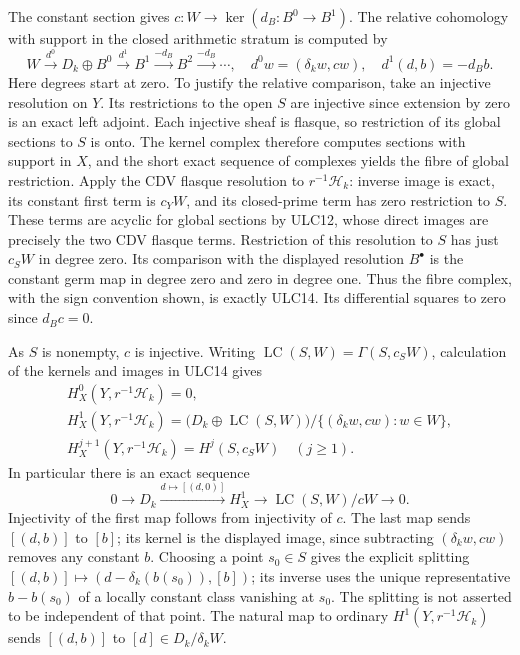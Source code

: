 \documentclass[11pt,a4paper]{article}
\theoremstyle{definition}\newtheorem{definition}[theorem]{Definition}
\begin{document}
The constant section gives $c:W\to\ker(d_B:B^0\to B^1)$.
The relative cohomology with support in the closed arithmetic
stratum is computed by
\begin{equation}\tag{ULC14}
 W\xrightarrow{d^0}D_k\oplus B^0\xrightarrow{d^1}B^1
 \xrightarrow{-d_B}B^2\xrightarrow{-d_B}\cdots,
 \quad d^0w=(\delta_kw,cw),\quad d^1(d,b)=-d_Bb.
\end{equation}
Here degrees start at zero. To justify the relative comparison,
take an injective resolution on $Y$. Its restrictions to the open
$S$ are injective since extension by zero is an exact left adjoint.
Each injective sheaf is flasque, so restriction of its global
sections to $S$ is onto. The kernel complex therefore computes
sections with support in $X$, and the short exact sequence of
complexes yields the fibre of global restriction. Apply the
CDV flasque resolution to $r^{-1}\mathcal H_k$: inverse image
is exact, its constant first term is $c_YW$, and its closed-prime
term has zero restriction to $S$. These terms are acyclic for
global sections by ULC12, whose direct images are precisely the
two CDV flasque terms. Restriction of this resolution to $S$
has just $c_SW$ in degree zero. Its comparison with the displayed
resolution $B^\bullet$ is the constant germ map in degree zero
and zero in degree one. Thus the fibre complex, with the sign
convention shown, is exactly ULC14. Its differential squares to
zero since $d_Bc=0$.

As $S$ is nonempty, $c$ is injective. Writing
$\operatorname{LC}(S,W)=\Gamma(S,c_SW)$, calculation of the
kernels and images in ULC14 gives
\begin{equation}\tag{ULC15}
 \begin{gathered}
 H_X^0(Y,r^{-1}\mathcal H_k)=0,\\
 H_X^1(Y,r^{-1}\mathcal H_k)
 =\bigl(D_k\oplus\operatorname{LC}(S,W)\bigr)
        /\{(\delta_kw,cw):w\in W\},\\
 H_X^{j+1}(Y,r^{-1}\mathcal H_k)=H^j(S,c_SW)\quad(j\ge1).
 \end{gathered}
\end{equation}
In particular there is an exact sequence
\begin{equation}\tag{ULC16}
 0\longrightarrow D_k\xrightarrow{d\mapsto[(d,0)]}
 H_X^1\longrightarrow\operatorname{LC}(S,W)/cW\longrightarrow0.
\end{equation}
Injectivity of the first map follows from injectivity of $c$.
The last map sends $[(d,b)]$ to $[b]$; its kernel is the displayed
image, since subtracting $(\delta_kw,cw)$ removes any constant
$b$. Choosing a point $s_0\in S$ gives the explicit splitting
$[(d,b)]\mapsto(d-\delta_k(b(s_0)),[b])$; its inverse uses the
unique representative $b-b(s_0)$ of a locally constant class
vanishing at $s_0$. The splitting is not asserted to be independent
of that point. The natural map to ordinary $H^1(Y,r^{-1}\mathcal H_k)$
sends $[(d,b)]$ to $[d]\in D_k/\delta_kW$.
\end{document}
